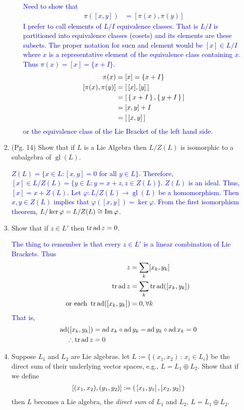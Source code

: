 \documentclass[12pt,a4paper]{report}
\newcommand{\BLUE}[1]{\textcolor{blue}{#1}}
\newcommand{\GL}{\operatorname{gl}}
\newcommand{\AD}{\operatorname{ad}}
\newcommand{\LB}[2]{\left [ #1,#2 \right ]}
\begin{document}
\begin{enumerate}[label=2.\arabic*]
\begin{enumerate}[label=(\roman*)]
	\BLUE{Need to show that 
	\begin{align*}
		\pi([x,y]) &= [\pi(x),\pi(y)]
	\end{align*}	I prefer to call elements of $L/I$ equivalence classes.  That is $L/I$ is partitioned into equivalence classes (cosets) and its elements are these subsets.  The proper notation for sucn and element would be $[x] \in L/I$ where $x$ is a representative element of the equivalence class containing $x$.  Thus $\pi(x) = [x] = \{x+I\}$.
	\begin{align*}
		\pi(x) &= [x] = \{x+I\}\\
		[\pi(x),\pi(y)] &= \left [\, [x],[y] \,\right ] \\
		&= \left [\, \left \{\, x+I \,\right \}, \left \{\, y+I \,\right \} \,\right ] \\
		&= [x,y] +I \\
		&= \left [\, [x,y] \,\right ]
\end{align*}	or the equivalence class of the Lie Bracket of the left hand side.
	}

\end{enumerate}

\item (Pg. 14) Show that if $L$ is a Lie Algebra then $L/Z(L)$ is isomorphic to a subalgebra of $\GL(L)$.

\BLUE{$Z(L) = \{x \in L: [x,y]=0$ for all $y\in L\}$.  Therefore, $[x]\in L/Z(L) = \{y\in L : y=x+z, z \in Z(L) \}$.  $Z(L)$ is an ideal.  Thus, $[x] = x +Z(L)$.  Let $\varphi : L/Z(L) \to \GL(L)$ be a homomorphism.  Then $x,y \in Z(L)$ implies that $\varphi([x,y]) = \ker \varphi$.  From the first isomorphism theorem, $L/\ker \varphi = L/Z(L) \cong \operatorname{Im} \varphi$. 
}

\item Show that if $z \in L'$ then $\TR \AD z = 0$.

\BLUE{The thing to remember is that every $z \in L'$ is a linear combination of Lie Brackets.  Thus
\begin{align*}
	z &= \sum_k [x_k, y_k] \\
	\TR \AD z &= \sum_k \TR \AD ([x_k, y_k]) \\
	\text{or each } \TR \AD ([x_k, y_k])&=0, \forall k
\end{align*}That is, 
\begin{align*}
	\AD ([x_k,y_k]) &= \AD x_k\circ \AD y_k - \AD y_k\circ \AD x_k = 0 \\
	\therefore \TR \AD z &= 0
\end{align*}
}

\item Suppose $L_1$ and $L_2$ are Lie algebras.  let $L := \{(x_1,x_2)\,:\, x_i \in L_i\}$ be the direct sum of their underlying vector spaces, e.g., $L = L_1 \oplus L_2$.  Show that if we define
\begin{align*}
	\LB{(x_1,x_2)}{(y_1,y_2)} := \PAREN{\LB{x_1}{y_1},\LB{x_2}{y_2}}
\end{align*}then $L$ becomes a Lie algebra, the \textit{direct sum} of $L_1$ and $L_2$, $L = L_1 \oplus L_2$.  
\begin{enumerate}[label=(\roman*)]


\end{enumerate}
\end{enumerate}
\end{document}
